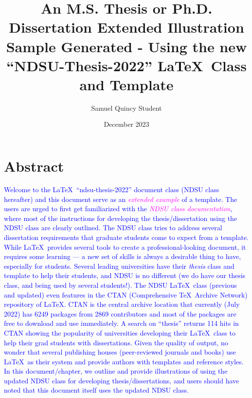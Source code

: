 \documentclass[phd,showgrids]{ndsu-thesis-2022}
\title{An M.S. Thesis or Ph.D. Dissertation Extended Illustration Sample Generated - Using the new ``NDSU-Thesis-2022'' \LaTeX\ Class and Template}
\author{Samuel Quincy Student}
\date{December 2023}
\newcommand\italk[1]{\textcolor{blue}{#1}}  %
\begin{document}



\section{Abstract}
\italk{Welcome to the \LaTeX\ ``ndsu-thesis-2022'' document class (NDSU class hereafter) and this document serve as an \textcolor{magenta}{\emph{extended example}} of a template. The users are urged to first get familiarized with the \textcolor{magenta}{\emph{NDSU class documentation}}, where most of the instructions for developing the thesis/dissertation using the NDSU class are clearly outlined. The NDSU class tries to address several dissertation requirements that graduate students come to expect from a template. While \LaTeX\ provides several tools to create a professional-looking document, it requires some learning --- a new set of skills is always a desirable thing to have, especially for students. Several leading universities have their \emph{thesis} class and template to help their students, and NDSU is no different (we do have our thesis class, and being used by several students!). The NDSU \LaTeX\ class (previous and updated) even features in the CTAN (Comprehensive \TeX\ Archive Network) repository of \LaTeX. CTAN is the central archive location that currently (July 2022) has 6249 packages from 2869 contributors and most of the packages are free to download and use immediately. A search on ``thesis'' returns 114 hits in CTAN showing the popularity of universities developing their \LaTeX\ class to help their grad students with dissertations. Given the quality of output, no wonder that several publishing houses (peer-reviewed journals and books) use \LaTeX\ as their system and provide authors with templates and reference styles. In this document/chapter, we outline and provide illustrations of using the updated NDSU class for developing thesis/dissertations, and users should have noted that this document itself uses the updated NDSU class.\\ 
}
\end{document}
